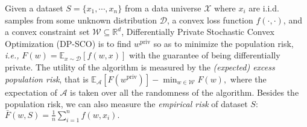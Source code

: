 \documentclass[12pt]{alt2022} %
\begin{document}
	\begin{definition}\label{definition:1}
		Given a dataset $S=\{x_1,\cdots,x_n\}$ from a data universe $\mathcal{X}$ where $x_i$ are i.i.d. samples from some unknown distribution $\mathcal{D}$, a convex loss function $f(\cdot, \cdot)$, and a convex constraint set  $\mathcal{W} \subseteq \mathbb{R}^d$, Differentially Private Stochastic Convex Optimization (DP-SCO) is to find $w^{\text{priv}}$ so as to minimize the population risk, {\em i.e.,} $F (w)=\mathbb{E}_{x\sim \mathcal{D}}[f(w, x)]$
		with the guarantee of being differentially private.
		 The utility of the algorithm is measured by the \textit{(expected) excess population risk}, that is  $\mathbb{E}_{\mathcal{A}}[F (w^{\text{priv}})]-\min_{w\in \mathbb{\mathcal{W}}}F(w),$
where the expectation of $\mathcal{A}$ is taken over all the randomness of the algorithm. Besides 
the population risk, we can also measure the \textit{empirical risk} of dataset $S$: $\bar{F}(w, S)=\frac{1}{n}\sum_{i=1}^n f(w, x_i).$
	\end{definition}
\end{document}
